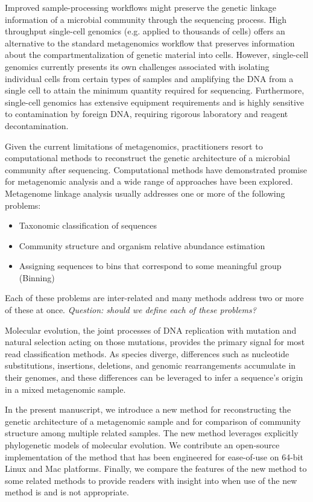 \documentclass[10pt]{article}
\begin{document}
Improved sample-processing workflows might preserve the genetic linkage information of a microbial community through the sequencing process.
High throughput single-cell genomics (e.g. applied to thousands of cells) offers an alternative to the standard metagenomics workflow that preserves information about the compartmentalization of genetic material into cells. 
However, single-cell genomics currently presents its own challenges associated with isolating individual cells from certain types of samples and amplifying the {DNA} from a single cell to attain the minimum quantity required for sequencing. 
Furthermore, single-cell genomics has extensive equipment requirements and is highly sensitive to contamination by foreign DNA, requiring rigorous laboratory and reagent decontamination.

Given the current limitations of metagenomics, practitioners resort to computational methods to reconstruct the genetic architecture of a microbial community after sequencing.
Computational methods have demonstrated promise for metagenomic analysis and a wide range of approaches have been explored.
Metagenome linkage analysis usually addresses one or more of the following problems:
\begin{itemize}
\item Taxonomic classification of sequences
\item Community structure and organism relative abundance estimation
\item Assigning sequences to bins that correspond to some meaningful group (Binning)
\end{itemize}
Each of these problems are inter-related and many methods address two or more of these at once.
\textit{Question: should we define each of these problems?}

Molecular evolution, the joint processes of DNA replication with mutation and natural selection acting on those mutations, provides the primary signal for most read classification methods.
As species diverge, differences such as nucleotide substitutions, insertions, deletions, and genomic rearrangements accumulate in their genomes, and these differences can be leveraged to infer a sequence's origin in a mixed metagenomic sample.

In the present manuscript, we introduce a new method for reconstructing the genetic architecture of a metagenomic sample and for comparison of community structure among multiple related samples.
The new method leverages explicitly phylogenetic models of molecular evolution. 
We contribute an open-source implementation of the method that has been engineered for ease-of-use on 64-bit Linux and Mac platforms.
Finally, we compare the features of the new method to some related methods to provide readers with insight into when use of the new method is and is not appropriate.
\end{document}
